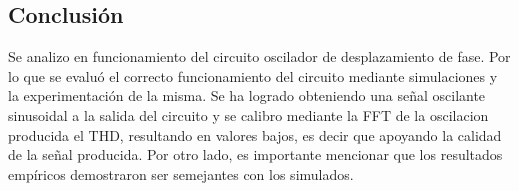 \subsection{Conclusión}

Se analizo en funcionamiento del circuito oscilador de desplazamiento de fase. Por lo que se evaluó el correcto funcionamiento del circuito mediante simulaciones y la experimentación de la misma. Se ha logrado obteniendo una señal oscilante sinusoidal a la salida del circuito y se calibro mediante la FFT de la oscilacion producida el THD, resultando en valores bajos, es decir que apoyando la calidad de la señal producida. Por otro lado, es importante mencionar que los resultados empíricos demostraron ser semejantes con los simulados.